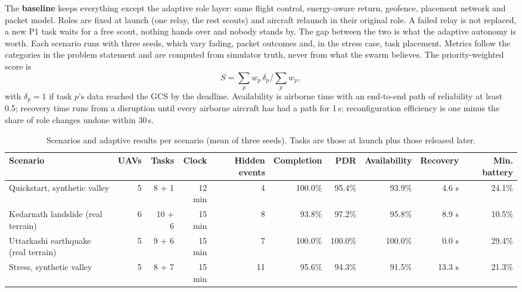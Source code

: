 \documentclass[10pt,a4paper,twocolumn]{article}
\begin{document}
The \textbf{baseline} keeps everything except the adaptive role layer: same flight control, energy-aware return, geofence, placement network and packet model. Roles are fixed at launch (one relay, the rest scouts) and aircraft relaunch in their original role. A failed relay is not replaced, a new P1 task waits for a free scout, nothing hands over and nobody stands by. The gap between the two is what the adaptive autonomy is worth. Each scenario runs with three seeds, which vary fading, packet outcomes and, in the stress case, task placement. Metrics follow the categories in the problem statement and are computed from simulator truth, never from what the swarm believes. The priority-weighted score is
\begin{equation}
S=\sum_p w_p\,\delta_p\Big/\sum_p w_p,
\label{eq:score}
\end{equation}
with $\delta_p=1$ if task $p$'s data reached the GCS by the deadline. Availability is airborne time with an end-to-end path of reliability at least 0.5; recovery time runs from a disruption until every airborne aircraft has had a path for 1\,s; reconfiguration efficiency is one minus the share of role changes undone within 30\,s.

\begin{table}[t]
\centering
\caption{Scenarios and adaptive results per scenario (mean of three seeds). Tasks are those at launch plus those released later.}
\label{tab:results}
\footnotesize
\renewcommand{\arraystretch}{1.1}
\begin{tabular*}{\textwidth}{@{\extracolsep{\fill}}lrrrrrrrrr@{}}
\toprule
\textsf{\textbf{Scenario}} & \textsf{\textbf{UAVs}} & \textsf{\textbf{Tasks}} & \textsf{\textbf{Clock}} & \textsf{\textbf{Hidden events}} & \textsf{\textbf{Completion}} & \textsf{\textbf{PDR}} & \textsf{\textbf{Availability}} & \textsf{\textbf{Recovery}} & \textsf{\textbf{Min. battery}}\\
\midrule
Quickstart, synthetic valley & 5 & 8 + 1 & 12 min & 4 & 100.0\% & 95.4\% & 93.9\% & 4.6 s & 24.1\%\\
Kedarnath landslide (real terrain) & 6 & 10 + 6 & 15 min & 8 & 93.8\% & 97.2\% & 95.8\% & 8.9 s & 10.5\%\\
Uttarkashi earthquake (real terrain) & 5 & 9 + 6 & 15 min & 7 & 100.0\% & 100.0\% & 100.0\% & 0.0 s & 29.4\%\\
Stress, synthetic valley & 5 & 8 + 7 & 15 min & 11 & 95.6\% & 94.3\% & 91.5\% & 13.3 s & 21.3\%\\
\bottomrule
\end{tabular*}
\end{table}
\end{document}
